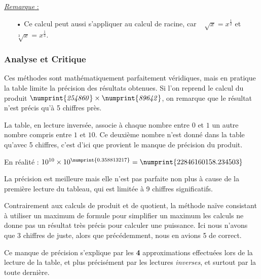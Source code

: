 \documentclass[a4paper, twoside]{article}
\begin{document}
{\begin{large}
\begin{tabular}{l|l}
	\end{tabular}
	\end{large}
	}

	\vspace{0.3 cm}

	{\noindent\underline{\textit{Remarque} :}}

	\begin{itemize}

		\item[•] Ce calcul peut aussi s'appliquer au calcul de racine, car ~{\Large $\sqrt[]{x} = x^{\frac{1}{2}}$} et {\Large $\sqrt[3]{x} = x^{\frac{1}{3}}$}.
		
	\end{itemize}

	\vfill

	\subsubsection*{Analyse et Critique}

	Ces méthodes sont mathématiquement parfaitement véridiques, mais en pratique la table limite la précision des résultats obtenues. Si l'on reprend le calcul du produit $\mathit{\numprint{254860} \times \numprint{89642}}$, on remarque que le résultat n'est précis qu'à 5 chiffres près.

	La table, en lecture inversée, associe à chaque nombre entre $0$ et $1$ un autre nombre compris entre $1$ et $10$. Ce deuxième nombre n'est donné dans la table qu'avec 5 chiffres, c'est d'ici que provient le manque de précision du produit.

	En réalité : $10 ^{ 10 } \times 10^{\numprint{0.358813217}} = \numprint{22846160158.234503}$

	La précision est meilleure mais elle n'est pas parfaite non plus à cause de la première lecture du tableau, qui est limitée à 9 chiffres significatifs.\\


	\par Contrairement aux calculs de produit et de quotient, la méthode naïve consistant à utiliser un maximum de formule pour simplifier un maximum les calculs ne donne pas un résultat très précis pour calculer une puissance. Ici nous n'avons que 3 chiffres de juste, alors que précédemment, nous en avions 5 de correct.

	Ce manque de précision s'explique par les \textbf{4} approximations effectuées lors de la lecture de la table, et plus précisément par les lectures \textit{inverses}, et surtout par la toute dernière.\\
\end{document}
